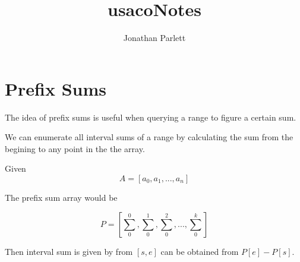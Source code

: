 \documentclass[14pt]{extreport}
\title{usacoNotes}
\author{Jonathan Parlett}
\begin{document}
\maketitle

\section{Prefix Sums}

The idea of prefix sums is useful when querying a range to figure a certain sum.

We can enumerate all interval sums of a range by calculating the sum from the begining to any point in the the array.

Given
\[ A = [a_0, a_1, ..., a_n] \]

The prefix sum array would be

\[ P = [\sum_0^0, \sum_0^1, \sum_0^2, ..., \sum_0^k] \]

Then interval sum is given by from $[s,e]$ can be obtained from $P[e] - P[s]$.
\end{document}
